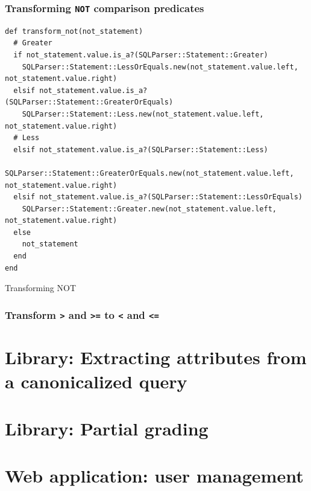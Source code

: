 \subsubsection{Transforming \texttt{NOT} comparison predicates}

\begin{listing}[H]
\begin{verbatim}
def transform_not(not_statement)
  # Greater
  if not_statement.value.is_a?(SQLParser::Statement::Greater)
    SQLParser::Statement::LessOrEquals.new(not_statement.value.left, not_statement.value.right)
  elsif not_statement.value.is_a?(SQLParser::Statement::GreaterOrEquals)
    SQLParser::Statement::Less.new(not_statement.value.left, not_statement.value.right)
  # Less
  elsif not_statement.value.is_a?(SQLParser::Statement::Less)
    SQLParser::Statement::GreaterOrEquals.new(not_statement.value.left, not_statement.value.right)
  elsif not_statement.value.is_a?(SQLParser::Statement::LessOrEquals)
    SQLParser::Statement::Greater.new(not_statement.value.left, not_statement.value.right)
  else
    not_statement
  end
end
\end{verbatim}
\caption{Transforming NOT}
\label{fig:transforming_not}
\end{listing}

\subsubsection{Transform \texttt{>} and \texttt{>=} to \texttt{<} and \texttt{<=}}

\section{Library: Extracting attributes from a canonicalized query}

\section{Library: Partial grading}

\section{Web application: user management}
